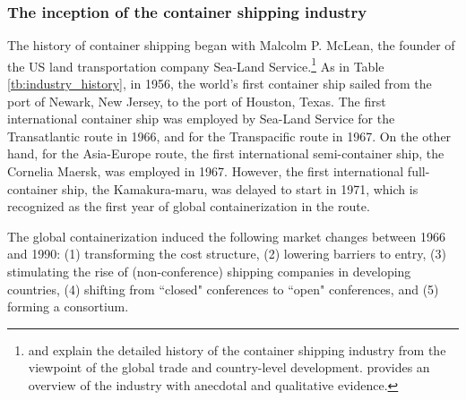 \documentclass[11pt]{article}
\begin{document}


\subsubsection{The inception of the container shipping industry}\label{subsec:inception_of_container_shipping_industry}

The history of container shipping began with Malcolm P. McLean, the founder of the US land transportation company Sea-Land Service.\footnote{\cite{bernhofen2016estimating} and \cite{rua2014diffusion} explain the detailed history of the container shipping industry from the viewpoint of the global trade and country-level development. \cite{levinson2016box} provides an overview of the industry with anecdotal and qualitative evidence.}  As in Table \ref{tb:industry_history}, in 1956, the world's first container ship sailed from the port of Newark, New Jersey, to the port of Houston, Texas. The first international container ship was employed by Sea-Land Service for the Transatlantic route in 1966, and for the Transpacific route in 1967. On the other hand, for the Asia-Europe route, the first international semi-container ship, the Cornelia Maersk, was employed in 1967. However, the first international full-container ship, the Kamakura-maru, was delayed to start in 1971, which is recognized as the first year of global containerization in the route.

The global containerization induced the following market changes between 1966 and 1990: (1) transforming the cost structure, (2) lowering barriers to entry, (3) stimulating the rise of (non-conference) shipping companies in developing countries, (4) shifting from ``closed" conferences to ``open" conferences, and (5) forming a consortium.
\end{document}
